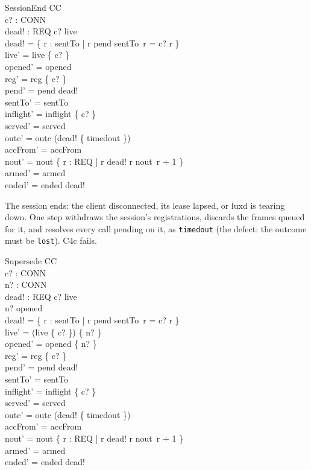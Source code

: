 \documentclass[a4paper,10pt,fleqn]{article}
\begin{document}
\begin{schema}{SessionEnd}
  \Delta CC \\
  c? : CONN \\
  dead! : \power REQ
\where
  c? \in live \\
  dead! = \{ r : \dom sentTo | r \in pend \land sentTo~r = c? \spot r \} \\
  live' = live \setminus \{ c? \} \\
  opened' = opened \\
  reg' = reg \nrres \{ c? \} \\
  pend' = pend \setminus dead! \\
  sentTo' = sentTo \\
  inflight' = inflight \nrres \{ c? \} \\
  served' = served \\
  outc' = outc \oplus (dead! \cross \{ timedout \}) \\
  accFrom' = accFrom \\
  nout' = nout \oplus
    \{ r : REQ | r \in dead! \spot r \mapsto nout~r + 1 \} \\
  armed' = armed \\
  ended' = ended \cup dead!
\end{schema}

The session ends: the client disconnected, its lease lapsed, or luxd is
tearing down.  One step withdraws the session's registrations, discards the
frames queued for it, and resolves every call pending on it, as
\texttt{timedout} (the defect: the outcome must be \texttt{lost}).  C4c fails.

\begin{schema}{Supersede}
  \Delta CC \\
  c? : CONN \\
  n? : CONN \\
  dead! : \power REQ
\where
  c? \in live \\
  n? \notin opened \\
  dead! = \{ r : \dom sentTo | r \in pend \land sentTo~r = c? \spot r \} \\
  live' = (live \setminus \{ c? \}) \cup \{ n? \} \\
  opened' = opened \cup \{ n? \} \\
  reg' = reg \nrres \{ c? \} \\
  pend' = pend \setminus dead! \\
  sentTo' = sentTo \\
  inflight' = inflight \nrres \{ c? \} \\
  served' = served \\
  outc' = outc \oplus (dead! \cross \{ timedout \}) \\
  accFrom' = accFrom \\
  nout' = nout \oplus
    \{ r : REQ | r \in dead! \spot r \mapsto nout~r + 1 \} \\
  armed' = armed \\
  ended' = ended \cup dead!
\end{schema}
\end{document}
